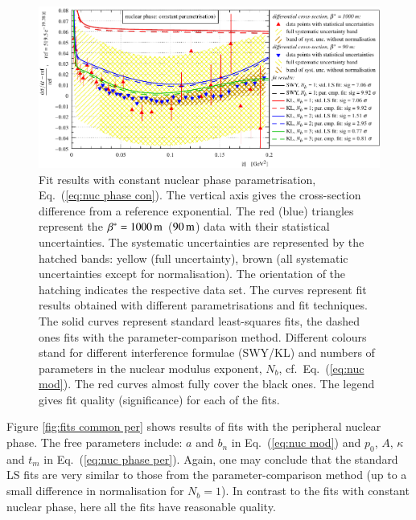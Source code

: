 
\begin{figure}
\begin{center}
\includegraphics{fig/fits_common_con.pdf}
\caption{%
Fit results with constant nuclear phase parametrisation, Eq.~(\ref{eq:nuc phase con}). The vertical axis gives the cross-section difference from a reference exponential. The red (blue) triangles represent the $\beta^* = 1000\,{\rm m}$ ($90\,{\rm m}$) data with their statistical uncertainties. The systematic uncertainties are represented by the hatched bands: yellow (full uncertainty), brown (all systematic uncertainties except for normalisation). The orientation of the hatching indicates the respective data set.
The curves represent fit results obtained with different parametrisations and fit techniques. The solid curves represent standard least-squares fits, the dashed ones fits with the parameter-comparison method. Different colours stand for different interference formulae (SWY/KL) and numbers of parameters in the nuclear modulus exponent, $N_b$, cf.~Eq.~(\ref{eq:nuc mod}). The red curves almost fully cover the black ones. The legend gives fit quality (significance) for each of the fits.
}
\label{fig:fits common con}
\end{center}
\end{figure}

Figure \ref{fig:fits common per} shows results of fits with the peripheral nuclear phase. The free parameters include: $a$ and $b_n$ in Eq.~(\ref{eq:nuc mod}) and $p_0$, $A$, $\kappa$ and $t_m$ in Eq.~(\ref{eq:nuc phase per}). Again, one may conclude that the standard LS fits are very similar to those from the parameter-comparison method (up to a small difference in normalisation for $N_b = 1$). In contrast to the fits with constant nuclear phase, here all the fits have reasonable quality.

